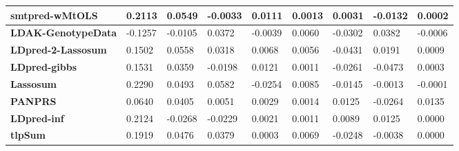 \documentclass[pdflatex,sn-basic]{sn-jnl}
\begin{document}
\begin{table}[!ht]
{\begin{tabular}{|l|l|l|l|l|l|l|l|l|}
\hline
\textbf{smtpred-wMtOLS} & \cellcolor[HTML]{95CD7E}0.2113 & \cellcolor[HTML]{82C77D}0.0549 & \cellcolor[HTML]{FBAD78}-0.0033 & \cellcolor[HTML]{C4DA81}0.0111 & \cellcolor[HTML]{FEE883}0.0013 & \cellcolor[HTML]{BAD780}0.0031 & \cellcolor[HTML]{FCBE7B}-0.0132 & \cellcolor[HTML]{FFEB84}0.0002 \\
\hline
\textbf{LDAK-GenotypeData} & \cellcolor[HTML]{FA9C74}-0.1257 & \cellcolor[HTML]{F98D72}-0.0105 & \cellcolor[HTML]{F0E784}0.0372 & \cellcolor[HTML]{F9EA84}-0.0039 & \cellcolor[HTML]{FFEB84}0.0060 & \cellcolor[HTML]{FEDE81}-0.0302 & \cellcolor[HTML]{C6DB81}0.0382 & \cellcolor[HTML]{FEE582}-0.0006 \\
\hline
\textbf{LDpred-2-Lassosum} & \cellcolor[HTML]{C6DB81}0.1502 & \cellcolor[HTML]{7DC67D}0.0558 & \cellcolor[HTML]{FAEA84}0.0318 & \cellcolor[HTML]{D4DF82}0.0068 & \cellcolor[HTML]{FEEA83}0.0056 & \cellcolor[HTML]{FCC27C}-0.0431 & \cellcolor[HTML]{EBE583}0.0191 & \cellcolor[HTML]{FEEB84}0.0009 \\
\hline
\textbf{LDpred-gibbs} & \cellcolor[HTML]{C4DA81}0.1531 & \cellcolor[HTML]{E4E483}0.0359 & \cellcolor[HTML]{F98D72}-0.0198 & \cellcolor[HTML]{C1D981}0.0121 & \cellcolor[HTML]{FEE883}0.0011 & \cellcolor[HTML]{FEE783}-0.0261 & \cellcolor[HTML]{F8766D}-0.0473 & \cellcolor[HTML]{FFEB84}0.0003 \\
\hline
\textbf{Lassosum} & \cellcolor[HTML]{87C97E}0.2290 & \cellcolor[HTML]{9FD07F}0.0493 & \cellcolor[HTML]{C8DC81}0.0582 & \cellcolor[HTML]{FBA175}-0.0254 & \cellcolor[HTML]{FAEA84}0.0085 & \cellcolor[HTML]{E6E483}-0.0145 & \cellcolor[HTML]{FDD780}-0.0013 & \cellcolor[HTML]{FEE983}-0.0001 \\
\hline
\textbf{PANPRS} & \cellcolor[HTML]{FEE582}0.0640 & \cellcolor[HTML]{CCDD82}0.0405 & \cellcolor[HTML]{FCBD7B}0.0051 & \cellcolor[HTML]{E1E383}0.0029 & \cellcolor[HTML]{FEE883}0.0014 & \cellcolor[HTML]{A3D17F}0.0125 & \cellcolor[HTML]{FBA276}-0.0264 & \cellcolor[HTML]{DEE283}0.0135 \\
\hline
\textbf{LDpred-inf} & \cellcolor[HTML]{95CD7E}0.2124 & \cellcolor[HTML]{F8696B}-0.0268 & \cellcolor[HTML]{F98770}-0.0229 & \cellcolor[HTML]{E4E483}0.0021 & \cellcolor[HTML]{FEE883}0.0011 & \cellcolor[HTML]{ACD380}0.0089 & \cellcolor[HTML]{F7E984}0.0125 & \cellcolor[HTML]{FEE983}0.0000 \\
\hline
\textbf{tlpSum} & \cellcolor[HTML]{A5D17F}0.1919 & \cellcolor[HTML]{A8D27F}0.0476 & \cellcolor[HTML]{EEE784}0.0379 & \cellcolor[HTML]{EBE583}0.0003 & \cellcolor[HTML]{FEEB84}0.0069 & \cellcolor[HTML]{FEEA83}-0.0248 & \cellcolor[HTML]{FDD27F}-0.0038 & \cellcolor[HTML]{FEE983}0.0000 \\

\end{tabular}}
\end{table}
\end{document}
